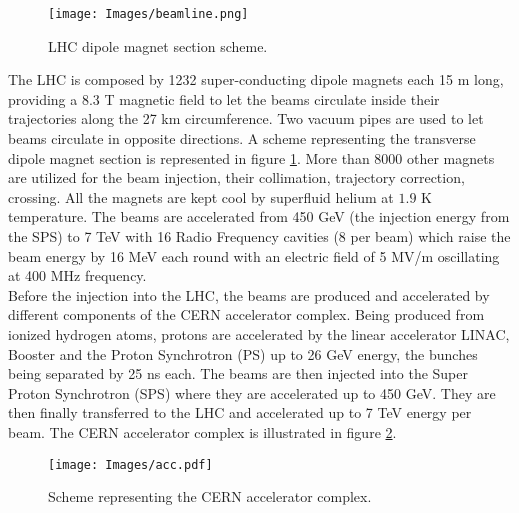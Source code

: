 \begin{figure}
\centering
\texttt{[image: Images/beamline.png]}
\caption{LHC dipole magnet section scheme.}
\label{beamline}
\end{figure}
The LHC is composed by 1232 super-conducting dipole magnets each 15 m
long, providing a $8.3$ T magnetic field to let the beams circulate inside their trajectories 
along the 27 km circumference. Two vacuum pipes are used to let beams
circulate in opposite directions. A scheme representing the transverse dipole magnet 
section is represented in figure \ref{beamline}. More than 8000 other magnets are utilized
for the beam injection, their collimation, trajectory correction, crossing. All the
magnets are kept cool by superfluid helium at $1.9$ K temperature.
The beams are accelerated from 450 GeV (the injection energy from the SPS) to 7
TeV with 16 Radio Frequency cavities (8 per beam) which raise the beam energy
by 16 MeV each round with an electric field of 5 MV/m oscillating at 400 MHz
frequency.\\
Before the injection into the LHC, the beams are produced and accelerated by
different components of the CERN accelerator complex. Being produced from
ionized hydrogen atoms, protons are accelerated by the linear accelerator LINAC,
Booster and the Proton Synchrotron (PS) up to 26 GeV energy, the bunches being
separated by 25 ns each. The beams are then injected into the Super Proton Synchrotron 
(SPS) where they are accelerated up to 450 GeV. They are then finally
transferred to the LHC and accelerated up to 7 TeV energy per beam. The CERN
accelerator complex is illustrated in figure \ref{acc}.
\begin{figure}
\centering
\texttt{[image: Images/acc.pdf]}
\caption{Scheme representing the CERN accelerator complex.}
\label{acc}
\end{figure}

